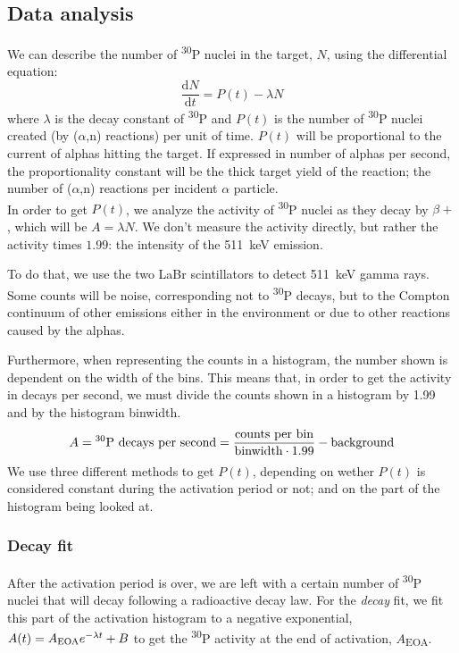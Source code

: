 \documentclass[a4paper,12pt]{report}
\newcommand{\dif}{\text{d}}
\newcommand{\ddt}[1]{\frac{\dif #1}{\dif t}}
\newcommand{\an}{($\alpha$,n) }
\newcommand{\Piso}{\textsuperscript{30}P }
\begin{document}
\subsection{Data analysis}
We can describe the number of \Piso nuclei in the target, $N$, using the differential equation:
\begin{equation}
	\ddt{N} = P(t) -\lambda N
	\label{activation_diffeq}
\end{equation}
where $\lambda$ is the decay constant of \Piso and $P(t)$ is the number of \Piso nuclei created (by \an reactions) per unit of time.
$P(t)$ will be proportional to the current of alphas hitting the target.
If expressed in number of alphas per second, the proportionality constant will be the thick target yield of the reaction; the number of \an reactions per incident $\alpha$ particle.
\\

In order to get $P(t)$, we analyze the activity of \Piso nuclei as they decay by $\beta +$, which will be $A = \lambda N$.
We don't measure the activity directly, but rather the activity times $1.99$: the intensity of the \qty{511}{\keV} emission.	%

To do that, we use the two LaBr scintillators to detect \qty{511}{\keV} gamma rays.
Some counts will be noise, corresponding not to \Piso decays, but to the Compton continuum of other emissions either in the environment or due to other reactions caused by the alphas.

Furthermore, when representing the counts in a histogram, the number shown is dependent on the width of the bins.
This means that, in order to get the activity in decays per second, we must divide the counts shown in a histogram by 1.99 and by the histogram binwidth.
\begin{equation}
	A = \text{\Piso decays per second} = \frac{\text{counts per bin}}{\text{binwidth}\cdot\num{1.99}} - \text{background}
\end{equation}
We use three different methods to get $P(t)$, depending on wether $P(t)$ is considered constant during the activation period or not; and on the part of the histogram being looked at.

\subsubsection{Decay fit}
After the activation period is over, we are left with a certain number of \Piso nuclei that will decay following a radioactive decay law.
For the \textit{decay} fit, we fit this part of the activation histogram to a negative exponential, $A(t) = A\textsubscript{EOA} e^{-\lambda t} + B$ to get the \Piso activity at the end of activation, $A$\textsubscript{EOA}.
\end{document}
